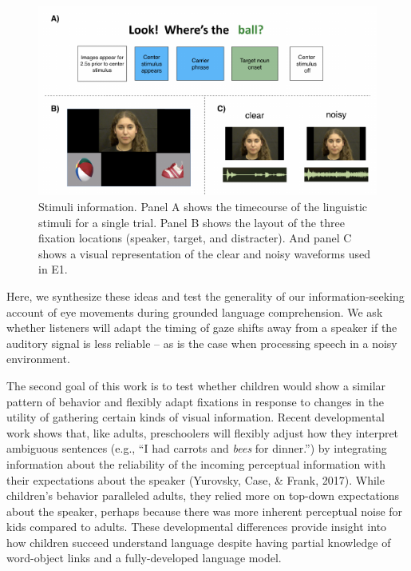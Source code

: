 \documentclass[10pt, letterpaper]{article}
\newenvironment{CodeChunk}{}{}
\begin{document}
\begin{CodeChunk}
\begin{figure}[tb]

{\centering \includegraphics[width=0.8\linewidth]{figs/stimuli_plot-1} 

}

\caption[Stimuli information]{Stimuli information. Panel A shows the timecourse of the linguistic stimuli for a single trial. Panel B shows the layout of the three fixation locations (speaker, target, and distracter). And panel C shows a visual representation of the clear and noisy waveforms used in E1.}\label{fig:stimuli_plot}
\end{figure}
\end{CodeChunk}

Here, we synthesize these ideas and test the generality of our
information-seeking account of eye movements during grounded language
comprehension. We ask whether listeners will adapt the timing of gaze
shifts away from a speaker if the auditory signal is less reliable -- as
is the case when processing speech in a noisy environment.

The second goal of this work is to test whether children would show a
similar pattern of behavior and flexibly adapt fixations in response to
changes in the utility of gathering certain kinds of visual information.
Recent developmental work shows that, like adults, preschoolers will
flexibly adjust how they interpret ambiguous sentences (e.g., ``I had
carrots and \emph{bees} for dinner.'') by integrating information about
the reliability of the incoming perceptual information with their
expectations about the speaker (Yurovsky, Case, \& Frank, 2017). While
children's behavior paralleled adults, they relied more on top-down
expectations about the speaker, perhaps because there was more inherent
perceptual noise for kids compared to adults. These developmental
differences provide insight into how children succeed understand
language despite having partial knowledge of word-object links and a
fully-developed language model.
\end{document}
